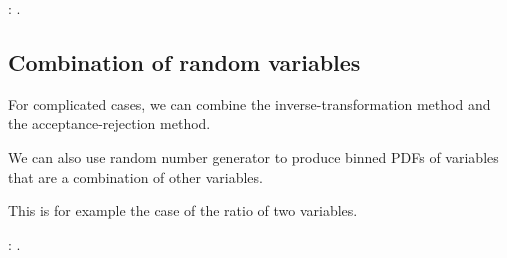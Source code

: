 : .

\subsection{Combination of random variables}
\label{subsec:combination_of_random_var}

For complicated cases, we can combine the inverse-transformation method and the acceptance-rejection method.

We can also use random number generator to produce binned PDFs of variables that are a combination of other variables.

This is for example the case of the ratio of two variables.

: .
